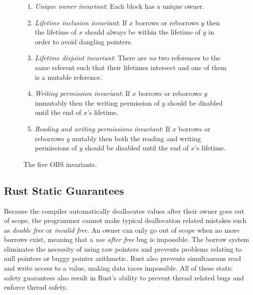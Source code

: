\begin{figure}[h]
\centering
\begin{enumerate}
    \item \textit{Unique owner invariant}: Each block has a unique owner.
    \item \textit{Lifetime inclusion invariant}: If $x$ borrows or reborrows $y$ then the lifetime of $x$ should always be within the lifetime of $y$ in order to avoid dangling pointers.
    \item \textit{Lifetime disjoint invariant}: There are \textit{no} two references to the same referent such that their lifetimes intersect and one of them is a mutable reference.
    \item \textit{Writing permission invariant}: If $x$ borrows or reborrows $y$ immutably then the writing permission of $y$ should be disabled until the end of $x$'s lifetime.
    \item \textit{Reading and writing permissions invariant}: If $x$ borrows or reborrows $y$ mutably then both the reading and writing permissions of $y$ should be disabled until the end of $x$'s lifetime.
\end{enumerate}
\caption{The five OBS invariants.\cite{Kan2018AnEO}}
\label{fig:obsinvariants}
\end{figure}

\subsection{Rust Static Guarantees}
Because the compiler automatically deallocates values after their owner goes out of scope, the programmer cannot make typical deallocation related mistakes such as \textit{double free} or \textit{invalid free}.
An owner can only go out of scope when no more borrows exist, meaning that a \textit{use after free} bug is impossible.
The borrow system eliminates the necessity of using raw pointers and prevents problems relating to null pointers or buggy pointer arithmetic.
Rust also prevents simultaneous read and write access to a value, making data races impossible.
All of these static safety guarantees also result in Rust's ability to prevent thread related bugs and enforce thread safety.

